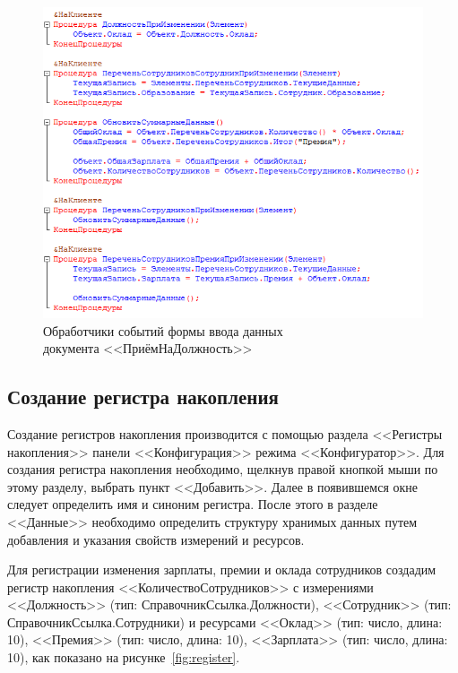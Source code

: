 \begin{figure}[h!]
  \centering
  \includegraphics[width=150mm]{pic/form_event_handlers}
  \caption{Обработчики событий формы ввода данных \\
    документа <<ПриёмНаДолжность>>}
  \label{fig:form_event_handlers}
\end{figure}


\subsection{Создание регистра накопления}

Создание регистров накопления производится с помощью раздела
<<Регистры накопления>> панели <<Конфигурация>> режима <<Конфигуратор>>.
Для создания регистра накопления необходимо,
щелкнув правой кнопкой мыши по этому
разделу, выбрать пункт <<Добавить>>. Далее в появившемся окне
следует определить имя и синоним регистра.
После этого в разделе <<Данные>> необходимо определить структуру
хранимых данных путем добавления и указания свойств измерений и ресурсов.

\pagebreak

Для регистрации изменения зарплаты, премии и оклада сотрудников
создадим регистр накопления <<КоличествоСотрудников>> с измерениями
<<Должность>> (тип: СправочникСсылка.Должности),
<<Сотрудник>> (тип: СправочникСсылка.Сотрудники)
и ресурсами
<<Оклад>> (тип: число, длина: 10),
<<Премия>> (тип: число, длина: 10),
<<Зарплата>> (тип: число, длина: 10),
как показано на рисунке~\ref{fig:register}.

